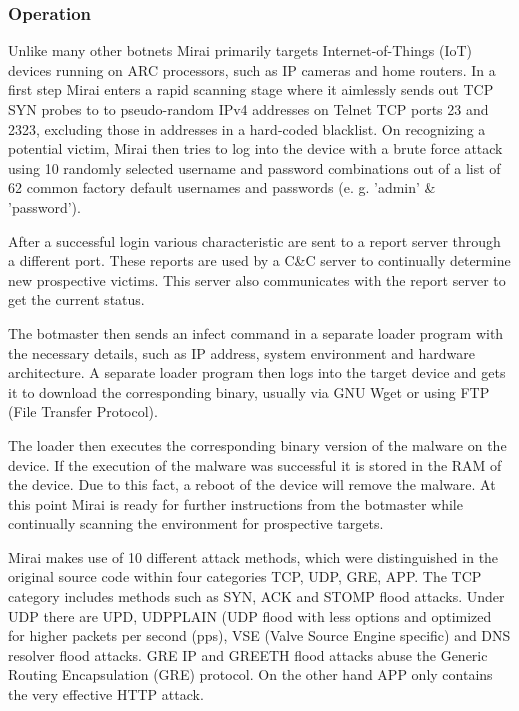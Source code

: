 \subsubsection{Operation}
		Unlike many other botnets Mirai primarily targets Internet-of-Things (IoT) devices running on ARC processors, such as IP cameras and home routers. In a first step Mirai enters a rapid scanning stage where it aimlessly sends out TCP SYN probes to to pseudo-random IPv4 addresses on Telnet TCP ports 23 and 2323, excluding those in addresses in a hard-coded blacklist. \cite{Kolias17} On recognizing a potential victim, Mirai then tries to log into the device with a brute force attack using 10 randomly selected username and password combinations out of a list of 62 common factory default usernames and passwords (e. g. 'admin' \& 'password'). \cite{Antonakakis17}
		
After a successful login various characteristic are sent to a report server through a different port. These reports are used by a C\&C server to continually determine new prospective victims. This server also communicates with the report server to get the current status. \cite{Kolias17}

The botmaster then sends an infect command in a separate loader program with the necessary details, such as IP address, system environment and hardware architecture. A separate loader program then logs into the target device and gets it to download the corresponding binary, usually via GNU Wget or using FTP (File Transfer Protocol). \cite{Kolias17}

The loader then executes the corresponding binary version of the malware on the device. If the execution of the malware was successful it is stored in the RAM of the device. Due to this fact, a reboot of the device will remove the malware. At this point Mirai is ready for further instructions from the botmaster while continually scanning the environment for prospective targets. \cite{Kolias17}

Mirai makes use of 10 different attack methods, which were distinguished in the original source code within four categories TCP, UDP, GRE, APP. The TCP category includes methods such as SYN, ACK and STOMP flood attacks. Under UDP there are UPD, UDPPLAIN (UDP flood with less options and optimized for higher packets per second (pps), VSE (Valve Source Engine specific) and DNS resolver flood attacks. GRE IP and GREETH flood attacks abuse the Generic Routing Encapsulation (GRE) protocol. On the other hand APP only contains the very effective HTTP attack. \cite{Winward}

